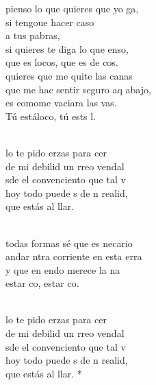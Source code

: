 \begin{cancion}%
	 pienso lo que quieres que yo ga,\\
	si tengoue hacer caso \\
	a tus pabras,\\
	si quieres te diga lo que enso,\\
	que es  locos, que es de cos.\\
\jump
	 quieres que me quite las canas\\
	que me hac sentir seguro aq abajo, \\
	es comome vaciara las vas.\\
	Tú estáloco, tú ests l.\\\jump\\
	\begin{chorus}%
	lo te pido erzas para cer \\
	de mi debilid un rreo vendal\\
	sde el convenciento que tal v\\
	hoy todo puede s de n realid,\\
	que  estás al llar.  \\
	\end{chorus}%
	\jump\\
	 todas formas sé que es necario\\
	andar ntra corriente en esta erra\\
	y que en endo merece la na\\
	estar co, estar co.\\\jump\\
	\begin{chorus}%
	lo te pido erzas para cer \\
	de mi debilid un rreo vendal\\
	sde el convenciento que tal v\\
	hoy todo puede s de n realid,\\
	que  estás al llar. *\\
	\end{chorus}%
	\jump\\
\end{cancion}%
